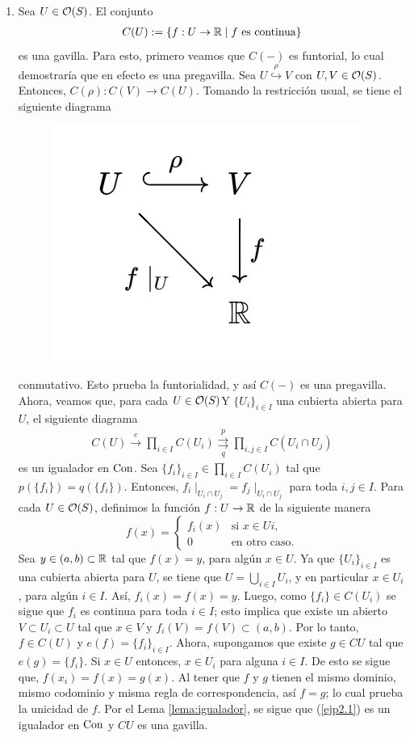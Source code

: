 \begin{ejp}
\text{}
    \begin{enumerate}
        \item Sea $U\in{\mathcal O}(S)$. El conjunto 
        \begin{eqnarray*}
            C(U):=\{f:U\to{\mathbb R}\mid f\text{ es continua}\}
        \end{eqnarray*}
        es una gavilla. Para esto, primero veamos que $C(-)$ es funtorial, lo cual demostraría que en efecto es una pregavilla.
        Sea $U\overset{\rho}{\hookrightarrow} V$ con $U,V\in{\mathcal O}(S)$. Entonces, $C(\rho):C(V)\to C(U)$. Tomando la restricción usual, se tiene el siguiente diagrama
        \begin{figure}[H]
            \centering
            \includegraphics[width=0.25\linewidth]{img/diagram2.1.png}
        \end{figure}
        conmutativo. Esto prueba la funtorialidad, y así $C(-)$ es una pregavilla.\\
        Ahora, veamos que, para cada $U\in {\mathcal O}(S)$Y $\{U_i\}_{i\in I}$ una cubierta abierta para $U$, el siguiente diagrama 
        \begin{eqnarray}\label{ejp2.1}
            C(U)\xrightarrow{e}\prod_{i\in I} C(U_i)\overset{p}{\underset{q}{\rightrightarrows}} \prod_{i,j\in I}C(U_i\cap U_j)
        \end{eqnarray}
        es un igualador en ${\mathrm{Con}}$. Sea $\{f_i\}_{i\in I}\in\prod_{i\in I}C(U_i)$ tal que $p(\{f_i\})=q(\{f_i\})$. Entonces, $f_i\mid_{U_i\cap U_j}=f_j\mid_{U_i\cap U_j}$ para toda $i,j\in I$. Para cada $U\in{\mathcal O}(S)$, definimos la función $f:U\to{\mathbb R}$ de la siguiente manera
        \begin{equation*}
            f(x)=\begin{cases}
                f_i(x) & \text{si } x\in Ui,\\
                0 &\text{en otro caso.}
            \end{cases}
        \end{equation*}
        Sea $y\in (a,b)\subset{\mathbb R}$ tal que $f(x)=y$, para algún $x\in U$. Ya que $\{U_i\}_{i\in I}$ es una cubierta abierta para $U$, se tiene que $U=\bigcup_{i\in I}U_i$, y en particular $x\in U_i$, para algún $i\in I$. Así, $f_i(x)=f(x)=y$. Luego, como $\{f_i\}\in C(U_i)$ se sigue que $f_i$ es continua para toda $i\in I$; esto implica que existe un abierto $V\subset U_i\subset U$ tal que $x\in V$ y $f_i(V)=f(V)\subset(a,b)$. Por lo tanto, $f\in C(U)$ y $e(f)=\{f_i\}_{i\in I}$. Ahora, supongamos que existe $g\in CU$ tal que $e(g)=\{f_i\}$. Si $x\in U$ entonces, $x\in U_i$ para alguna $i\in I$. De esto se sigue que, $f(x_i)=f(x)=g(x)$. Al tener que $f$ y $g$ tienen el mismo dominio, mismo codominio y misma regla de correspondencia, así $f=g$; lo cual prueba la unicidad de $f$. Por el Lema \ref{lema:igualador}, se sigue que (\ref{ejp2.1}) es un igualador en ${\mathrm{Con}}$ y $CU$ es una gavilla. 

\end{enumerate}
\end{ejp}
